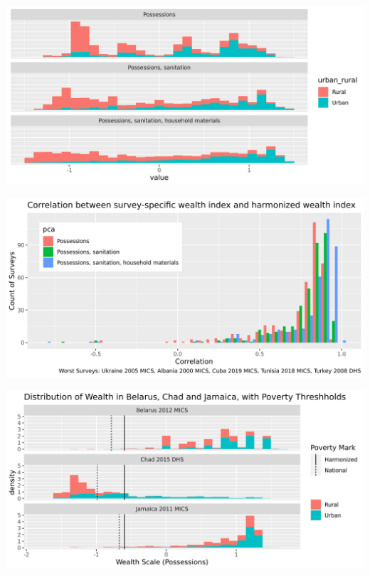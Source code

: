 \documentclass[aspectratio=169]{beamer}
\begin{document}
\begin{frame}
\includegraphics[width=\textwidth]{../res/urban_rural_histograms.png}
\end{frame}

\begin{frame}
\includegraphics[width=\textwidth]{../res/correlation_histogram_all.png}
\end{frame}

\begin{frame}
\includegraphics[width=\textwidth]{../res/example_histogram_multiple.png}
\end{frame}
\end{document}
